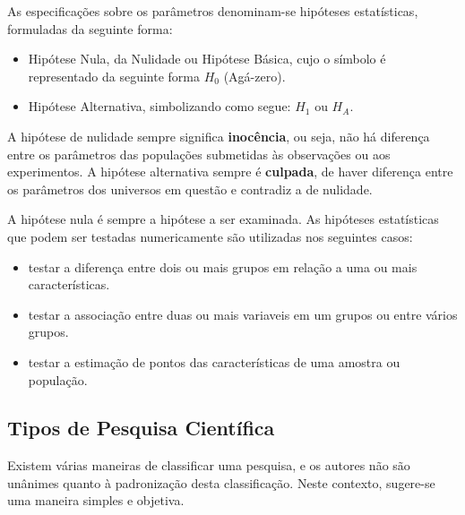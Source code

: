 


\newpage
As especificações sobre os parâmetros denominam-se hipóteses estatísticas, formuladas da seguinte forma: 

\begin{itemize}
\item Hipótese Nula, da Nulidade ou Hipótese Básica, cujo o símbolo é representado da seguinte forma $H_{0}$ (Agá-zero).
\item Hipótese Alternativa, simbolizando como segue: $H_{1}$ ou $H_{A}$.
\end{itemize}

A hipótese de nulidade sempre significa \textbf{inocência}, ou seja, não há diferença entre os parâmetros das populações submetidas às observações ou aos experimentos. A hipótese alternativa sempre é \textbf{culpada}, de haver diferença entre os parâmetros dos universos em questão e contradiz a de nulidade.\vskip0.3cm

A hipótese nula é sempre a hipótese a ser examinada. As hipóteses estatísticas que podem ser testadas numericamente são utilizadas nos seguintes casos:

\begin{itemize}
\item testar a diferença entre dois ou mais grupos em relação a uma ou mais características.
\item testar a associação entre duas ou mais variaveis em um grupos ou entre vários grupos. 
\item testar a estimação de pontos das características de uma amostra ou população.
\end{itemize}

\subsection{Tipos de Pesquisa Científica}

Existem várias maneiras de classificar uma pesquisa, e os autores não são unânimes quanto à padronização desta classificação. Neste contexto, sugere-se uma maneira simples e objetiva. \vskip0.3cm 

